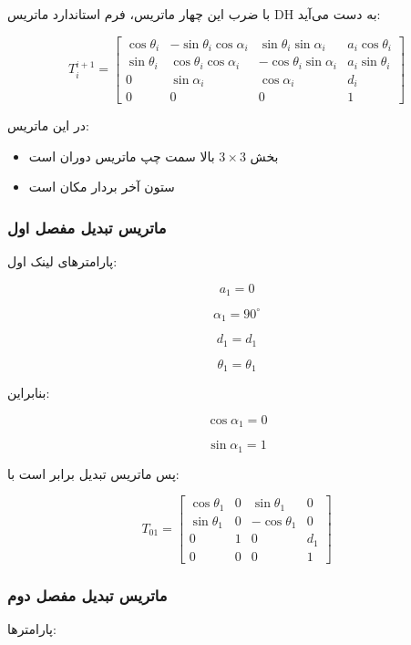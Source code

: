 \documentclass{article}
\begin{document}
با ضرب این چهار ماتریس، فرم استاندارد ماتریس DH به دست می‌آید:

\[
T_i^{i+1} =
\left[
\begin{array}{ccc|c}
	\cos\theta_i & -\sin\theta_i\cos\alpha_i & \sin\theta_i\sin\alpha_i & a_i\cos\theta_i \\
	\sin\theta_i & \cos\theta_i\cos\alpha_i & -\cos\theta_i\sin\alpha_i & a_i\sin\theta_i \\
	0 & \sin\alpha_i & \cos\alpha_i & d_i \\
	\hline
	0 & 0 & 0 & 1
\end{array}
\right]
\]

در این ماتریس:

\begin{itemize}
	\item بخش $3\times3$ بالا سمت چپ ماتریس دوران است
	\item ستون آخر بردار مکان است
\end{itemize}

\subsubsection{ماتریس تبدیل مفصل اول}

پارامترهای لینک اول:

\[
a_1=0
\]

\[
\alpha_1=90^\circ
\]

\[
d_1=d_1
\]

\[
\theta_1=\theta_1
\]

بنابراین:

\[
\cos\alpha_1 = 0
\]

\[
\sin\alpha_1 = 1
\]

پس ماتریس تبدیل برابر است با:

\[
T_{01} =
\left[
\begin{array}{ccc|c}
	\cos\theta_1 & 0 & \sin\theta_1 & 0 \\
	\sin\theta_1 & 0 & -\cos\theta_1 & 0 \\
	0 & 1 & 0 & d_1 \\
	\hline
	0 & 0 & 0 & 1
\end{array}
\right]
\]

\subsubsection{ماتریس تبدیل مفصل دوم}

پارامترها:
\end{document}
